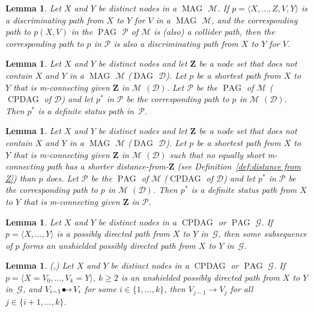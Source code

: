 \documentclass[11pt,a4paper]{article}
\newtheorem{lemma}[definition]{Lemma}
\DeclareMathOperator{\CPDAG}{CPDAG}
\DeclareMathOperator{\DAG}{DAG}
\DeclareMathOperator{\MAG}{MAG}
\DeclareMathOperator{\PAG}{PAG}
\newcommand{\g}[1][G]{\mathcal{#1}}
\newcommand{\pstar}[1][p]{{#1}^{*}}
\newcommand{\bulletarrow}{
  \setlength{\unitlength}{1mm}
  \begin{picture}(5,1)(0,0)
    \put(0.2,0){$\bullet$}
    \put(1,0){$\rightarrow$}
  \end{picture}
}
\begin{document}
\begin{lemma}
   \citep[Lemma~0 in][p208]{zhang2006causal}
  Let $X$ and $Y$ be distinct nodes in a $\MAG$ $\g[M]$. If $p = \langle X, \dots ,Z,V,Y \rangle$ is a discriminating path from $X$ to $Y$ for $V$ in a $\MAG$ $\g[M]$, and the corresponding path to $p(X,V)$ in the $\PAG$ $\g[P]$ of $\g[M]$ is (also) a collider path, then the corresponding path to $p$ in $\g[P]$ is also a discriminating path from $X$ to $Y$ for $V$.
   \label{lemma0}
\end{lemma}

\begin{lemma} \citep[cf.\ Lemma~1 in][p208]{zhang2006causal}
    Let $X$ and $Y$ be distinct nodes and let $\mathbf{Z}$ be a node set that does not contain $X$ and $Y$ in a $\MAG$ $\g[M]$ ($\DAG$ $\g[D]$). Let $p$ be a shortest path from $X$ to $Y$ that is m-connecting given $\mathbf{Z}$ in $\g[M]$ $(\g[D])$. Let $\g[P]$ be the $\PAG$ of $\g[M]$ ($\CPDAG$ of $\g[D]$) and let $\pstar$ in $\g[P]$ be the corresponding path to $p$ in $\g[M]$ $(\g[D])$. Then $\pstar$ is a definite status path in~$\g[P]$.
   \label{lemma1}
\end{lemma}

\begin{lemma} \citep[cf.\ Lemma~2 in][p213]{zhang2006causal}
    Let $X$ and $Y$ be distinct nodes and let $\mathbf{Z}$ be a node set that does not contain $X$ and $Y$ in a $\MAG$ $\g[M]$ ($\DAG$ $\g[D]$). Let $p$ be a shortest path from $X$ to $Y$ that is m-connecting given $\mathbf{Z}$ in $\g[M]$ $(\g[D])$ such that no equally short m-connecting path has a shorter distance-from-$\mathbf{Z}$ (see Definition~\ref{def:distance from Z}) than $p$ does. Let $\g[P]$ be the $\PAG$ of $\g[M]$ ($\CPDAG$ of $\g[D]$) and let $\pstar$ in $\g[P]$ be the corresponding path to $p$ in $\g[M]$ $(\g[D])$. Then $\pstar$ is a definite status path from $X$ to $Y$ that is m-connecting given $\mathbf{Z}$ in $\g[P]$.
   \label{lemma2}
\end{lemma}

\begin{lemma}{\citep[cf.\ Lemma~B.1 in][]{zhang2008completeness}}
  Let $X$ and $Y$ be distinct nodes in a $\CPDAG$ or $\PAG$ $\g$. If $p = \langle X, \dots ,Y \rangle$ is a possibly directed path from $X$ to $Y$ in~$\g$, then some subsequence of $p$ forms an unshielded possibly directed path from $X$ to $Y$ in~$\g$.
   \label{lemma:unshielded}
\end{lemma}

\begin{lemma}
   {(\citealp[cf.\ Lemma~B.2 in][]{zhang2008completeness},\citealp[ Lemma 7.2 in][]{maathuis2013generalized})}
   Let $X$ and $Y$ be distinct nodes in a $\CPDAG$ or $\PAG$ $\g$. If $p = \langle X=V_0, \dots , V_k=Y \rangle$, $k \geq 2$ is an unshielded possibly directed path from $X$ to $Y$ in~$\g$, and $V_{i-1} \bulletarrow V_{i}$ for some $i \in \{1,\dots,k\}$, then  $V_{j-1} \rightarrow V_{j}$ for all $j \in \{i+1,\dots,k\}$.
   \label{lemma:unshielded edges}
\end{lemma}
\end{document}
